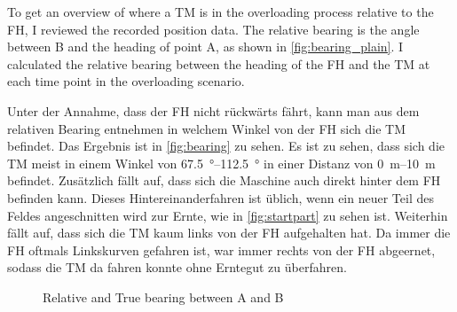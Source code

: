 \documentclass[]{nsm-thesis}
\begin{document}
To get an overview of where a \ac{TM} is in the overloading process relative to the \ac{FH}, I reviewed the recorded position data. The relative bearing is the angle between B and the heading of point A, as shown in \autoref{fig:bearing_plain}. I calculated the relative bearing between the heading of the \ac{FH} and the \ac{TM} at each time point in the overloading scenario.

Unter der Annahme, dass der \ac{FH} nicht rückwärts fährt, kann man aus dem relativen Bearing entnehmen in welchem Winkel von der \ac{FH} sich die \ac{TM} befindet. Das Ergebnis ist in \autoref{fig:bearing} zu sehen. Es ist zu sehen, dass sich die TM meist in einem Winkel von \SIrange{67.5}{112.5}{\degree} in einer Distanz von \SIrange{0}{10}{\metre} befindet.
Zusätzlich fällt auf, dass sich die Maschine auch direkt hinter dem FH befinden kann. Dieses Hintereinanderfahren ist üblich, wenn ein neuer Teil des Feldes angeschnitten wird zur Ernte, wie in \autoref{fig:startpart} zu sehen ist. 
Weiterhin fällt auf, dass sich die TM kaum links von der FH aufgehalten hat. Da immer die FH oftmals Linkskurven gefahren ist, war immer rechts von der FH abgeernet, sodass die TM da fahren konnte ohne Erntegut zu überfahren.




\begin{figure}%
	\centering
	\caption{Relative and True bearing between A and B}%
	\label{fig:bearing_fh_tm}%
\end{figure}
\end{document}
